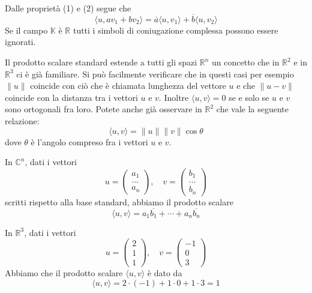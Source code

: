\begin{observation}
	Dalle propriet\`a (1) e (2) segue che
	\begin{equation*}
		\langle u, av_1 + bv_2 \rangle =
		\overline{a} \langle u, v_1 \rangle + \overline{b} \langle u, v_2 \rangle
	\end{equation*}
	Se il campo $\mathbb{K}$ \`e $\mathbb{R}$ tutti i simboli di coniugazione
	complessa possono essere ignorati.
\end{observation}

\begin{observation}
	Il prodotto scalare standard estende a tutti gli spazi $\mathbb{R}^n$ un concetto
	che in $\mathbb{R}^2$ e in $\mathbb{R}^3$ ci \`e gi\`a familiare. Si pu\`o
	facilmente verificare che in questi casi per esempio $\| u \|$ coincide con
	ci\`o che \`e chiamata lunghezza del vettore $u$ e che $\| u - v \|$ coincide
	con la distanza tra i vettori $u$ e $v$. Inoltre $\langle u, v \rangle = 0$ se
	e solo se $u$ e $v$ sono ortogonali fra loro. Potete anche gi\`a osservare in
	$\mathbb{R}^2$ che vale la seguente relazione:
	\begin{equation*}
		\langle u, v \rangle = \| u \| \| v \| \cos \theta
	\end{equation*}
	dove $\theta$ \`e l'angolo compreso fra i vettori $u$ e $v$.
\end{observation}

\begin{example}
	In $\mathbb{C}^n$, dati i vettori
	\begin{equation*}
		u = \begin{pmatrix}
			a_1 \\ \dots \\ a_n
		\end{pmatrix}, \quad
		v = \begin{pmatrix}
			b_1 \\ \dots \\ b_n
		\end{pmatrix}
	\end{equation*}
	scritti rispetto alla base standard, abbiamo il prodotto scalare
	\begin{equation*}
		\langle u, v \rangle = a_1 \overline{b_1} + \cdots + a_n \overline{b_n}
	\end{equation*}
\end{example}

\begin{example}
	In $\mathbb{R}^3$, dati i vettori
	\[
		u = \begin{pmatrix}
			2 \\ 1 \\ 1
		\end{pmatrix}, \quad
		v = \begin{pmatrix}
			-1 \\ 0 \\ 3
		\end{pmatrix}
	\]
	Abbiamo che il prodotto scalare $\langle u, v \rangle$ \`e dato da
	\[
		\langle u, v \rangle = 2 \cdot (-1) + 1 \cdot 0 + 1 \cdot 3 = 1
	\]
\end{example}

